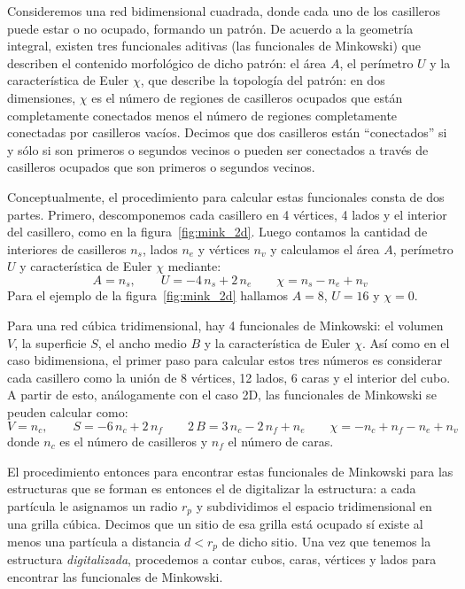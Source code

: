 Consideremos una red bidimensional cuadrada, donde cada uno de los casilleros puede estar o no ocupado, formando un patrón.
De acuerdo a la geometría integral, existen tres funcionales aditivas (las funcionales de Minkowski) que describen el contenido morfológico de dicho patrón: el área $A$, el perímetro $U$ y la característica de Euler $\chi$, que describe la topología del patrón: en dos dimensiones, $\chi$ es el número de regiones de casilleros ocupados que están completamente conectados menos el número de regiones completamente conectadas por casilleros vacíos. Decimos que dos casilleros están ``conectados'' si y sólo si son primeros o segundos vecinos o pueden ser conectados a través de casilleros ocupados que son primeros o segundos vecinos.

Conceptualmente, el procedimiento para calcular estas funcionales consta de dos partes. Primero, descomponemos cada casillero en 4 vértices, 4 lados y el interior del casillero, como en la figura~\ref{fig:mink_2d}. Luego contamos la cantidad de interiores de casilleros $n_s$, lados $n_e$ y vértices $n_v$ y calculamos el área $A$, perímetro $U$ y característica de Euler $\chi$ mediante:
\begin{equation}
A = n_s, \qquad U = -4\,n_s + 2\,n_e \qquad \chi = n_s - n_e + n_v
\end{equation}
Para el ejemplo de la figura~\ref{fig:mink_2d} hallamos $A = 8$, $U = 16$ y $\chi = 0$.

Para una red cúbica tridimensional, hay 4 funcionales de Minkowski: el volumen $V$, la superficie $S$, el ancho medio $B$ y la característica de Euler $\chi$.
Así como en el caso bidimensiona, el primer paso para calcular estos tres números es considerar cada casillero como la unión de 8 vértices, 12 lados, 6 caras y el interior del cubo.
A partir de esto, análogamente con el caso 2D, las funcionales de Minkowski se peuden calcular como:
\begin{equation}
V = n_c, \qquad S = -6\,n_c + 2\,n_f \qquad 2\,B = 3\,n_c - 2\,n_f + n_e \qquad \chi = -n_c + n_f - n_e + n_v
\end{equation}
donde $n_c$ es el número de casilleros y $n_f$ el número de caras.

El procedimiento entonces para encontrar estas funcionales de Minkowski para las estructuras que se forman es entonces el de digitalizar la estructura: a cada partícula le asignamos un radio $r_p$ y subdividimos el espacio tridimensional en una grilla cúbica.
Decimos que un sitio de esa grilla está ocupado sí existe al menos una partícula a distancia $d<r_p$ de dicho sitio.
Una vez que tenemos la estructura \emph{digitalizada}, procedemos a contar cubos, caras, vértices y lados para encontrar las funcionales de Minkowski.